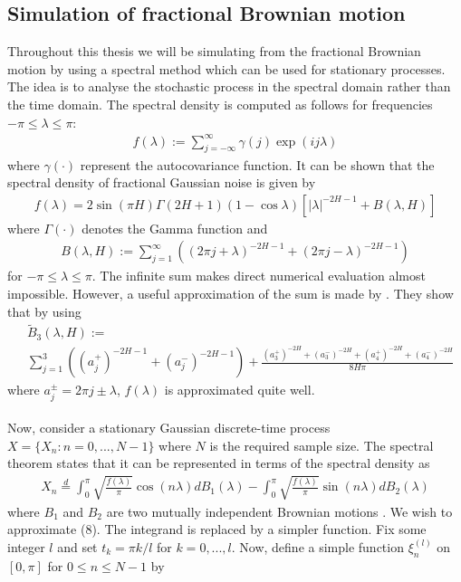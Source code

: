 \documentclass{article}
\begin{document}
\subsection{Simulation of fractional Brownian motion}
Throughout this thesis we will be simulating from the fractional Brownian motion by using a spectral method which can be used for stationary processes. The idea is to analyse the stochastic process in the spectral domain rather than the time domain. The spectral density is computed as follows for frequencies $-\pi\leq \lambda \leq \pi$:
\begin{align}
f(\lambda):= \sum_{j=-\infty}^\infty \gamma(j) \exp(ij\lambda)
\end{align}
where $\gamma(\cdot)$ represent the autocovariance function. It can be shown that the spectral density of fractional Gaussian noise is given by
\begin{align}
f(\lambda) = 2\sin(\pi H)\Gamma(2H+1)(1-\cos\lambda)[\vert\lambda\vert ^{-2H-1}+B(\lambda, H)]
\end{align}
where $\Gamma(\cdot)$ denotes the Gamma function and 
\begin{align}
B(\lambda, H) := \sum_{j=1}^\infty \left((2\pi j+\lambda)^{-2H-1}+(2\pi j-\lambda)^{-2H-1}\right)
\end{align}
for $-\pi\leq \lambda \leq \pi$. The infinite sum makes direct numerical evaluation almost impossible. However, a useful approximation of the sum is made by \cite{paxson}. They show that by using
\begin{align*}
&\tilde{B}_3(\lambda, H) :=\\ 
&\sum_{j=1}^3 \left(\left(a_j^+\right)^{-2H-1}+\left(a_j^-\right)^{-2H-1}\right)+\frac{\left(a_3^+\right)^{-2H}+\left(a_3^-\right)^{-2H}+\left(a_4^+\right)^{-2H}+\left(a_4^-\right)^{-2H}}{8H\pi}
\end{align*}
where $a^{\pm}_j=2\pi j\pm \lambda$, $f(\lambda)$ is approximated quite well.\\\\
Now, consider a stationary Gaussian discrete-time process $X=\{X_n: n = 0,...,N-1\}$ where $N$ is the required sample size. The spectral theorem states that it can be represented in terms of the spectral density as
\begin{align}
X_n\overset{d}{=}\int_0^\pi \sqrt{\frac{f(\lambda)}{\pi}}\cos(n\lambda)dB_1(\lambda)-\int_0^\pi \sqrt{\frac{f(\lambda)}{\pi}}\sin(n\lambda)dB_2(\lambda)
\end{align}
where $B_1$ and $B_2$ are two mutually independent Brownian motions \cite{dieker}. We wish to approximate (8). The integrand is replaced by a simpler function. Fix some integer $l$ and set $t_k = \pi k/l$ for $k=0,...,l$. Now, define a simple function $\xi_n^{(l)}$ on $[0,\pi]$ for $0\leq n\leq N-1$ by 
\end{document}
